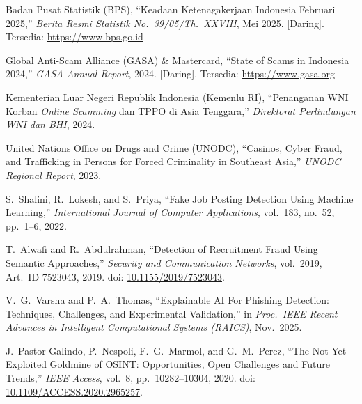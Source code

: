 \documentclass[12pt,a4paper]{article}
\begin{document}
\begingroup
\footnotesize
\begin{enumerate}[label={[\arabic*]}, labelindent=0pt, leftmargin=0.95cm, labelwidth=0.60cm, labelsep=0.35cm, align=left, itemsep=3pt, parsep=0pt, topsep=2pt]

\item Badan Pusat Statistik (BPS), ``Keadaan Ketenagakerjaan Indonesia Februari 2025,''
  \textit{Berita Resmi Statistik No.\ 39/05/Th.\ XXVIII}, Mei 2025. [Daring]. Tersedia: \url{https://www.bps.go.id}

\item Global Anti-Scam Alliance (GASA) \& Mastercard, ``State of Scams in Indonesia 2024,''
  \textit{GASA Annual Report}, 2024. [Daring]. Tersedia: \url{https://www.gasa.org}

\item Kementerian Luar Negeri Republik Indonesia (Kemenlu RI), ``Penanganan WNI Korban
  \textit{Online Scamming} dan TPPO di Asia Tenggara,'' \textit{Direktorat Perlindungan WNI dan BHI},
  2024.

\item United Nations Office on Drugs and Crime (UNODC), ``Casinos, Cyber Fraud, and Trafficking
  in Persons for Forced Criminality in Southeast Asia,'' \textit{UNODC Regional Report}, 2023.

\item S.\ Shalini, R.\ Lokesh, and S.\ Priya, ``Fake Job Posting Detection Using Machine
  Learning,'' \textit{International Journal of Computer Applications}, vol.\ 183, no.\ 52,
  pp.\ 1--6, 2022.

\item T.\ Alwafi and R.\ Abdulrahman, ``Detection of Recruitment Fraud Using Semantic
  Approaches,'' \textit{Security and Communication Networks}, vol.\ 2019, Art.\ ID 7523043, 2019.
  doi: \href{https://doi.org/10.1155/2019/7523043}{10.1155/2019/7523043}.

\item V.\ G.\ Varsha and P.\ A.\ Thomas, ``Explainable AI For Phishing Detection: Techniques,
  Challenges, and Experimental Validation,'' in \textit{Proc.\ IEEE Recent Advances in
  Intelligent Computational Systems (RAICS)}, Nov.\ 2025.

\item J.\ Pastor-Galindo, P.\ Nespoli, F.\ G.\ Marmol, and G.\ M.\ Perez, ``The Not Yet
  Exploited Goldmine of OSINT: Opportunities, Open Challenges and Future Trends,''
  \textit{IEEE Access}, vol.\ 8, pp.\ 10282--10304, 2020.
  doi: \href{https://doi.org/10.1109/ACCESS.2020.2965257}{10.1109/ACCESS.2020.2965257}.


\end{enumerate}
\end{document}
